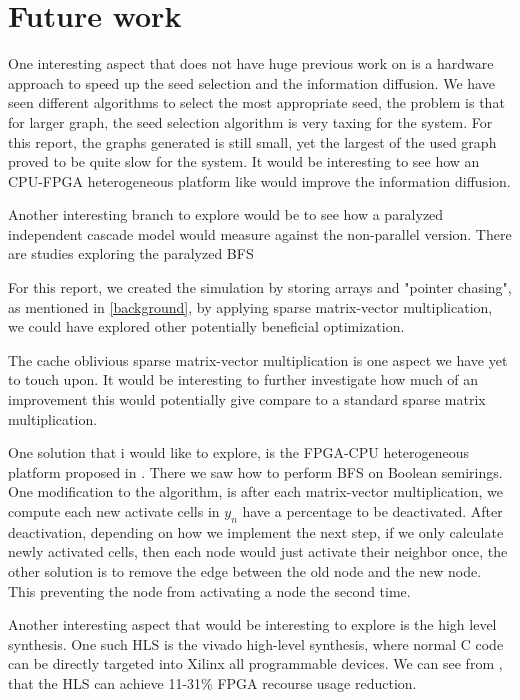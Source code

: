 \chapter{Future work}
One interesting aspect that does not have huge previous work on is a hardware approach to speed up the seed selection and the information diffusion. We have seen different algorithms to select the most appropriate seed, the problem is that for larger graph, the seed selection algorithm is very taxing for the system. For this report, the graphs generated is still small, yet the largest of the used graph proved to be quite slow for the system. It would be interesting to see how an CPU-FPGA heterogeneous platform like \cite{HybridBFS2015} would improve the information diffusion. 

Another interesting branch to explore would be to see how a paralyzed independent cascade model would measure against the non-parallel version. There are studies exploring the paralyzed BFS\cite{ParallelBFS2011}

For this report, we created the simulation by storing arrays and "pointer chasing", as mentioned in \ref{background}, by applying sparse matrix-vector multiplication, we could have explored other potentially beneficial optimization. 

The cache oblivious sparse matrix-vector multiplication is one aspect we have yet to touch upon. It would be interesting to further investigate how much of an improvement this would potentially give compare to a standard sparse matrix multiplication.


One solution that i would like to explore, is the FPGA-CPU heterogeneous platform proposed in \cite{HybridBFS2015}. There we saw how to perform BFS on Boolean semirings. One modification to the algorithm, is after each matrix-vector multiplication, we compute each new activate cells in $y_n$ have a percentage to be deactivated. After deactivation, depending on how we implement the next step, if we only calculate newly activated cells, then each node would just activate their neighbor once, the other solution is to remove the edge between the old node and the new node. This preventing the node from activating a node the second time.

Another interesting aspect that would be interesting to explore is the high level synthesis. One such HLS is the vivado high-level synthesis, where normal C code can be directly targeted into Xilinx all programmable devices. We can see from \cite{HLS2011}, that the HLS can achieve 11-31\% FPGA recourse usage reduction. 